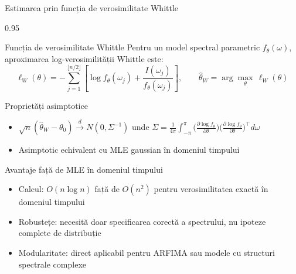 \documentclass[9pt, aspectratio=169, t]{beamer}
\begin{document}
\begin{frame}{Estimarea prin funcția de verosimilitate Whittle}
    \begin{cminipage}{0.95\textwidth}
    \vspace{-2mm}
    \begin{block}{Funcția de verosimilitate Whittle}
        {\small Pentru un model spectral parametric $f_\theta(\omega)$, aproximarea log-verosimilității Whittle este:
        \[
            \ell_W(\theta) = -\sum_{j=1}^{\lfloor n/2 \rfloor} \left[\log f_\theta(\omega_j) + \frac{I(\omega_j)}{f_\theta(\omega_j)}\right], \qquad \hat{\theta}_W = \arg\max_\theta \, \ell_W(\theta)
        \]}
    \end{block}
    \vspace{-2mm}
    \begin{exampleblock}{Proprietăți asimptotice}
        {\small
        \begin{itemize}\setlength{\itemsep}{0pt}
            \item $\sqrt{n}(\hat{\theta}_W - \theta_0) \xrightarrow{d} N(0, \Sigma^{-1})$ unde $\Sigma = \frac{1}{4\pi}\int_{-\pi}^{\pi} \bigl(\frac{\partial \log f_\theta}{\partial \theta}\bigr)\bigl(\frac{\partial \log f_\theta}{\partial \theta}\bigr)^{\!\top} d\omega$
            \item Asimptotic echivalent cu MLE gaussian în domeniul timpului
        \end{itemize}}
    \end{exampleblock}
    \vspace{-2mm}
    \begin{alertblock}{Avantaje față de MLE în domeniul timpului}
        {\small
        \begin{itemize}\setlength{\itemsep}{0pt}
            \item Calcul: $O(n \log n)$ față de $O(n^2)$ pentru verosimilitatea exactă în domeniul timpului
            \item Robustețe: necesită doar specificarea corectă a spectrului, nu ipoteze complete de distribuție
            \item Modularitate: direct aplicabil pentru ARFIMA sau modele cu structuri spectrale complexe
        \end{itemize}}
    \end{alertblock}
    \end{cminipage}
\end{frame}
\end{document}
